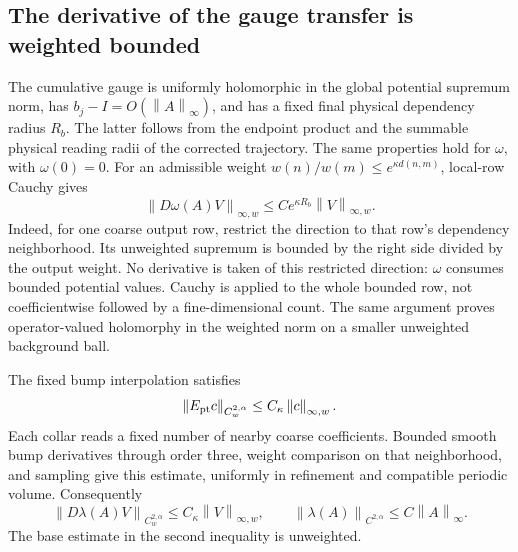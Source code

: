 \documentclass[11pt]{article}
\theoremstyle{remark}
\newcommand{\norm}[1]{\left\|#1\right\|}
\begin{document}
\subsection{The derivative of the gauge transfer is weighted bounded}

The cumulative gauge is uniformly holomorphic in the global
potential supremum norm, has $b_j-I=O(\norm{A}_\infty)$,
and has a fixed final physical dependency radius $R_b$.
The latter follows from the endpoint product and the summable
physical reading radii of the corrected trajectory.
The same properties hold for $\omega$, with $\omega(0)=0$.
For an admissible weight $w(n)/w(m)\le e^{\kappa d(n,m)}$,
local-row Cauchy gives
\begin{equation}\label{or-omega-derivative}
 \norm{D\omega(A)V}_{\infty,w}
      \le C e^{\kappa R_b}\norm{V}_{\infty,w}.
\end{equation}
Indeed, for one coarse output row, restrict the direction to that
row's dependency neighborhood. Its unweighted supremum is bounded
by the right side divided by the output weight. No derivative is
taken of this restricted direction: $\omega$ consumes bounded
potential values. Cauchy is applied to the whole bounded row,
not coefficientwise followed by a fine-dimensional count.
The same argument proves operator-valued holomorphy in the
weighted norm on a smaller unweighted background ball.

The fixed bump interpolation satisfies
\begin{equation}\label{or-point-weighted}
 \norm{E_{\rm pt}c}_{C^{2,\alpha}_w}
          \le C_\kappa\norm{c}_{\infty,w}.
\end{equation}
Each collar reads a fixed number of nearby coarse coefficients.
Bounded smooth bump derivatives through order three, weight
comparison on that neighborhood, and sampling give this estimate,
uniformly in refinement and compatible periodic volume.
Consequently
\begin{equation}\label{or-lambda}
 \norm{D\lambda(A)V}_{C^{2,\alpha}_w}
       \le C_\kappa\norm{V}_{\infty,w},\qquad
 \norm{\lambda(A)}_{C^{2,\alpha}}
       \le C\norm{A}_\infty.
\end{equation}
The base estimate in the second inequality is unweighted.
\end{document}
